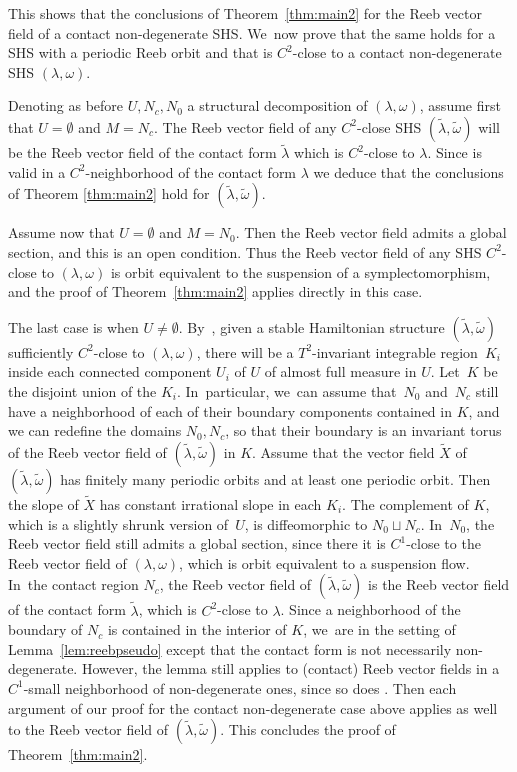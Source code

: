 \documentclass[11pt]{article}
\theoremstyle{definition}
\begin{document}
This shows that the conclusions of Theorem~\ref{thm:main2} for the Reeb vector field of a contact non-degenerate SHS. We~now prove that the same holds for a SHS with a periodic Reeb orbit and that is $C^2$-close to a contact non-degenerate SHS $(\lambda,\omega)$.

Denoting as before $U,N_c, N_0$ a structural decomposition of $(\lambda,\omega)$, assume first that $U=\emptyset$ and $M=N_c$. The Reeb vector field of any $C^2$-close SHS $(\widetilde \lambda, \widetilde \omega)$ will be the Reeb vector field of the contact form $\widetilde \lambda$ which is $C^2$-close to $\lambda$. Since \cite[Th.\,1.2]{CDR} is valid in a $C^2$-neighborhood of the contact form $\lambda$ we deduce that the conclusions of Theorem \ref{thm:main2} hold for $(\widetilde \lambda, \widetilde \omega)$.

Assume now that $U=\emptyset$ and $M=N_0$. Then the Reeb vector field admits a global section, and this is an open condition. Thus the Reeb vector field of any SHS $C^2$-close to $(\lambda,\omega)$ is orbit equivalent to the suspension of a symplectomorphism, and the proof of Theorem~\ref{thm:main2} applies directly in this case.

The last case is when $U\neq \emptyset$. By~\cite[Th.\,3.7]{CV1}, given a stable Hamiltonian structure $(\widetilde \lambda, \widetilde \omega)$ sufficiently $C^2$-close to $(\lambda,\omega)$, there will be a $T^2$-invariant integrable region~$K_i$ inside each connected component $U_i$ of $U$ of almost full measure in $U$. Let~$K$ be the disjoint union of the $K_i$. In~particular, we~can assume that~$N_0$ and~$N_c$ still have a neighborhood of each of their boundary components contained in $K$, and we can redefine the domains $N_0, N_c$, so that their boundary is an invariant torus of the Reeb vector field of $(\widetilde \lambda, \widetilde \omega)$ in $K$. Assume that the vector field $\widetilde X$ of $(\widetilde \lambda, \widetilde \omega)$ has finitely many periodic orbits and at least one periodic orbit. Then the slope of $\widetilde X$ has constant irrational slope in each $K_i$. The complement of $K$, which is a slightly shrunk version of~$U$, is diffeomorphic to $N_0\sqcup N_c$. In~$N_0$, the Reeb vector field still admits a global section, since there it is $C^1$-close to the Reeb vector field of $(\lambda,\omega)$, which is orbit equivalent to a suspension flow. In~the contact region $N_c$, the Reeb vector field of $(\widetilde \lambda, \widetilde \omega)$ is the Reeb vector field of the contact form $\widetilde \lambda$, which is $C^2$-close to $\lambda$. Since a neighborhood of the boundary of $N_c$ is contained in the interior of $K$, we~are in the setting of Lemma~\ref{lem:reebpseudo} except that the contact form is not necessarily non-degenerate. However, the lemma still applies to (contact) Reeb vector fields in a $C^1$-small neighborhood of non-degenerate ones, since so does \cite[Th.\,1.2]{CDR}. Then each argument of our proof for the contact non-degenerate case above applies as well to the Reeb vector field of $(\widetilde \lambda, \widetilde \omega)$. This concludes the proof of Theorem~\ref{thm:main2}.
\end{document}
